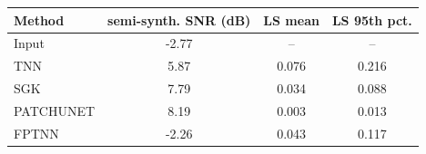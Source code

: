 \begin{tabular}{lccc}
\hline
Method & semi-synth. SNR (dB) & LS mean & LS 95th pct. \\
\hline
Input & -2.77 & -- & -- \\
TNN & 5.87 & 0.076 & 0.216 \\
SGK & 7.79 & 0.034 & 0.088 \\
PATCHUNET & 8.19 & 0.003 & 0.013 \\
FPTNN & -2.26 & 0.043 & 0.117 \\
\hline
\end{tabular}
